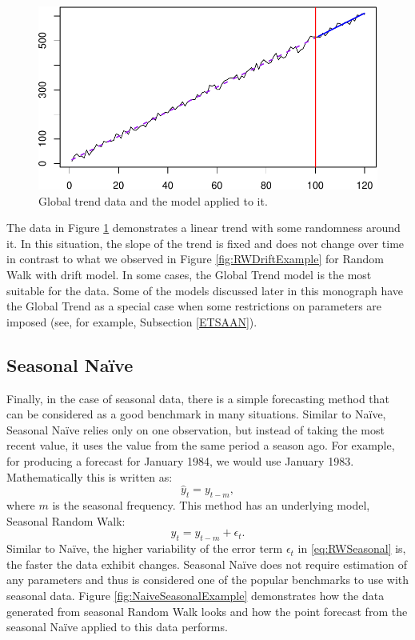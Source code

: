 \documentclass[]{book}
\theoremstyle{definition}
\theoremstyle{definition}
\theoremstyle{definition}
\theoremstyle{definition}
\theoremstyle{remark}
\begin{document}
\begin{figure}
\centering
\includegraphics{Svetunkov--2022----ADAM_files/figure-latex/GlobalTrendExample-1.pdf}
\caption{\label{fig:GlobalTrendExample}Global trend data and the model applied to it.}
\end{figure}

The data in Figure \ref{fig:GlobalTrendExample} demonstrates a linear trend with some randomness around it. In this situation, the slope of the trend is fixed and does not change over time in contrast to what we observed in Figure \ref{fig:RWDriftExample} for Random Walk with drift model. In some cases, the Global Trend model is the most suitable for the data. Some of the models discussed later in this monograph have the Global Trend as a special case when some restrictions on parameters are imposed (see, for example, Subsection \ref{ETSAAN}).

\hypertarget{NaiveSeasonal}{%
\subsection{Seasonal Naïve}\label{NaiveSeasonal}}

Finally, in the case of seasonal data, there is a simple forecasting method that can be considered as a good benchmark in many situations. Similar to Naïve, Seasonal Naïve relies only on one observation, but instead of taking the most recent value, it uses the value from the same period a season ago. For example, for producing a forecast for January 1984, we would use January 1983. Mathematically this is written as:
\begin{equation}
    \hat{y}_t = y_{t-m} ,
    \label{eq:NaiveSeasonal}
\end{equation}
where \(m\) is the seasonal frequency. This method has an underlying model, Seasonal Random Walk:
\begin{equation}
    y_t = y_{t-m} + \epsilon_t.
    \label{eq:RWSeasonal}
\end{equation}
Similar to Naïve, the higher variability of the error term \(\epsilon_t\) in \eqref{eq:RWSeasonal} is, the faster the data exhibit changes. Seasonal Naïve does not require estimation of any parameters and thus is considered one of the popular benchmarks to use with seasonal data. Figure \ref{fig:NaiveSeasonalExample} demonstrates how the data generated from seasonal Random Walk looks and how the point forecast from the seasonal Naïve applied to this data performs.
\end{document}
